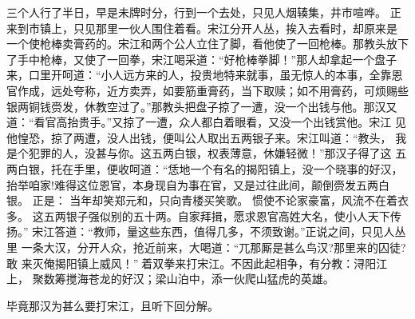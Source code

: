 三个人行了半日，早是未牌时分，行到一个去处，只见人烟辏集，井市喧哗。
正来到市镇上，只见那里一伙人围住着看。宋江分开人丛，挨入去看时，却原来是
一个使枪棒卖膏药的。宋江和两个公人立住了脚，看他使了一回枪棒。那教头放下
了手中枪棒，又使了一回拳，宋江喝采道：“好枪棒拳脚！”那人却拿起一个盘子
来，口里开呵道：“小人远方来的人，投贵地特来就事，虽无惊人的本事，全靠恩
官作成，远处夸称，近方卖弄，如要筋重膏药，当下取赎；如不用膏药，可烦赐些
银两铜钱赍发，休教空过了。”那教头把盘子掠了一遭，没一个出钱与他。那汉又
道：“看官高抬贵手。”又掠了一遭，众人都白着眼看，又没一个出钱赏他。宋江
见他惶恐，掠了两遭，没人出钱，便叫公人取出五两银子来。宋江叫道：“教头，
我是个犯罪的人，没甚与你。这五两白银，权表薄意，休嫌轻微！”那汉子得了这
五两白银，托在手里，便收呵道：“恁地一个有名的揭阳镇上，没一个晓事的好汉，
抬举咱家!难得这位恩官，本身现自为事在官，又是过往此间，颠倒赍发五两白银。
正是：
当年却笑郑元和，只向青楼买笑歌。
惯使不论家豪富，风流不在着衣多。
这五两银子强似别的五十两。自家拜揖，愿求恩官高姓大名，使小人天下传扬。”
宋江答道：“教师，量这些东西，值得几多，不须致谢。”正说之间，只见人丛里
一条大汉，分开人众，抢近前来，大喝道：“兀那厮是甚么鸟汉?那里来的囚徒?敢
来灭俺揭阳镇上威风！”着双拳来打宋江。不因此起相争，有分教：浔阳江上，
聚数筹搅海苍龙的好汉；梁山泊中，添一伙爬山猛虎的英雄。

毕竟那汉为甚么要打宋江，且听下回分解。